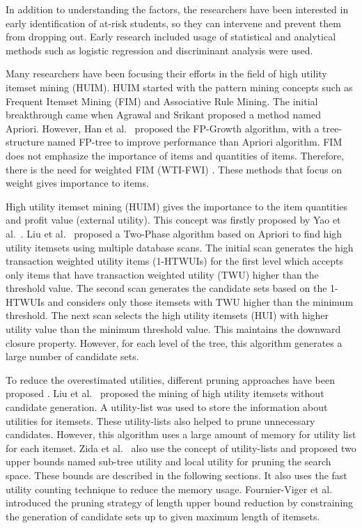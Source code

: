 \documentclass[11pt,openright]{report}
\begin{document}
In addition to understanding the factors, the researchers have been interested in early identification of at-risk students, so they can intervene and prevent them from dropping out. Early research included usage of statistical and analytical methods such as logistic regression and discriminant analysis were used. \cite{adejo2017,}





Many researchers have been focusing their efforts in the field of high utility itemset mining (HUIM). HUIM started with the pattern mining concepts \cite{Chen1996, Barber2003, Li2005, Han2000} such as Frequent Itemset Mining (FIM) and Associative Rule Mining. The initial breakthrough came when Agrawal and Srikant \cite{Agrawal1994} proposed a method named Apriori. However, Han et al.~\cite{Han2000} proposed the FP-Growth algorithm, with a tree-structure named FP-tree to improve performance than Apriori algorithm. FIM does not emphasize the importance of items and quantities of items. Therefore, there is the need for weighted FIM (WTI-FWI) \cite{Yun2013, Yun2014}. These methods that focus on weight gives importance to items.

High utility itemset mining (HUIM) \cite{Ahmed2009, Yao2006, Erwin2007, Yen2007, Lin2011, Wu2012, Yao2004, Tseng2013} gives the importance to the item quantities and profit value (external utility). This concept was firstly proposed by Yao et al.~\cite{Yao2004}. Liu et al.~\cite{Liu2005} proposed a Two-Phase algorithm based on Apriori to find high utility itemsets using multiple database scans. The initial scan generates the high transaction weighted utility items (1-HTWUIs) for the first level which accepts only items that have transaction weighted utility (TWU) higher than the threshold value. The second scan generates the candidate sets based on the 1-HTWUIs and considers only those itemsets with TWU higher than the minimum threshold. The next scan selects the high utility itemsets (HUI) with higher utility value than the minimum threshold value. This maintains the downward closure property. However, for each level of the tree, this algorithm generates a large number of candidate sets. 

To reduce the overestimated utilities, different pruning approaches have been proposed \cite{Chu2009, Liu2012, Lan2014, Krishnamoorthy2015, Zida2015, Tseng2013, Fournier-Viger2014, Song2014, Fournier-Viger2016}. Liu et al.~\cite{Liu2012} proposed the mining of high utility itemsets without candidate generation. A utility-list was used to store the information about utilities for itemsets. These utility-lists also helped to prune unnecessary candidates. However, this algorithm uses a large amount of memory for utility list for each itemset. Zida et al.~\cite{Zida2015} also use the concept of utility-lists and proposed two upper bounds named sub-tree utility and local utility for pruning the search space. These bounds are described in the following sections. It also uses the fast utility counting technique to reduce the memory usage. Fournier-Viger et al.~\cite{Fournier-Viger2016} introduced the pruning strategy of length upper bound reduction by constraining the generation of candidate sets up to given maximum length of itemsets. 
\end{document}
